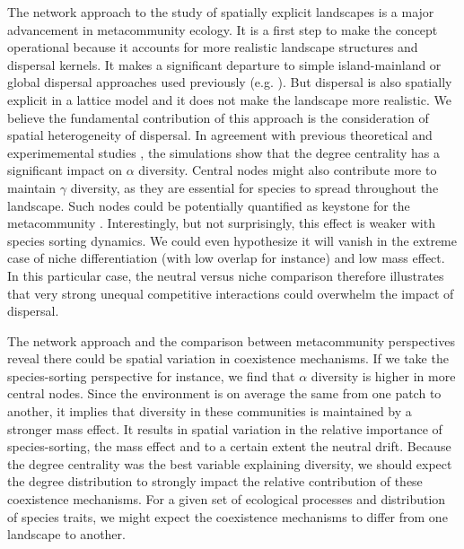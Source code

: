 \documentclass[12pt]{article}
\begin{document}
The network approach to the study of spatially explicit landscapes is a major
advancement in metacommunity ecology. It is a first step to make the concept
operational because it accounts for more realistic landscape structures and
dispersal kernels. It makes a significant departure to simple island-mainland or
global dispersal approaches used previously (e.g. \parencite{Tilman1994a,
Hubbell2001, Mouquet2002}). But dispersal is also spatially explicit in a
lattice model and it does not make the landscape more realistic. We believe the
fundamental contribution of this approach is the consideration of spatial
heterogeneity of dispersal. In agreement with previous theoretical
\parencite{Economo2011, Desjardins2012b} and experimemental studies
\parencite{Carrara2012}, the simulations show that the degree centrality has a
significant impact on $\alpha$ diversity. Central nodes might also contribute
more to maintain $\gamma$ diversity, as they are essential for species to spread
throughout the landscape. Such nodes could be potentially quantified as keystone
for the metacommunity \parencite{Mouquet2013}. Interestingly, but not
surprisingly, this effect is weaker with species sorting dynamics. We could even
hypothesize it will vanish in the extreme case of niche differentiation (with
low overlap for instance) and low mass effect. In this particular case, the
neutral versus niche comparison therefore illustrates that very strong unequal
competitive interactions could overwhelm the impact of dispersal.

The network approach and the comparison between metacommunity perspectives
reveal there could be spatial variation in coexistence mechanisms. If we take
the species-sorting perspective for instance, we find that $\alpha$ diversity is
higher in more central nodes. Since the environment is on average the same from
one patch to another, it implies that diversity in these communities is
maintained by a stronger mass effect. It results in spatial variation in the
relative importance of species-sorting, the mass effect and to a certain extent
the neutral drift. Because the degree centrality was the best variable
explaining diversity, we should expect the degree distribution to strongly
impact the relative contribution of these coexistence mechanisms. For a given
set of ecological processes and distribution of species traits, we might expect
the coexistence mechanisms to differ from one landscape to another.
\end{document}
